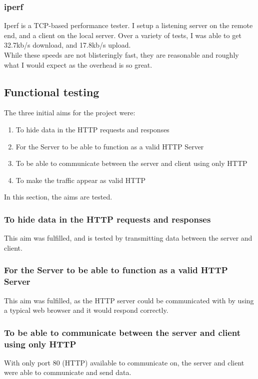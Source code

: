 \subsubsection{iperf}
Iperf is a TCP-based performance tester.
I setup a listening server on the remote end, and a client on the local server.
Over a variety of tests, I was able to get 32.7kb/s download, and 17.8kb/s upload.\\
While these speeds are not blisteringly fast, they are reasonable and roughly what I would expect as the overhead is so great.

\subsection{Functional testing}
The three initial aims for the project were:
\begin{enumerate}
    \item To hide data in the HTTP requests and responses
    \item For the Server to be able to function as a valid HTTP Server
    \item To be able to communicate between the server and client using only HTTP
    \item To make the traffic appear as valid HTTP
\end{enumerate}
In this section, the aims are tested.
\subsubsection{To hide data in the HTTP requests and responses}
This aim was fulfilled, and is tested by transmitting data between the server and client.

\subsubsection{For the Server to be able to function as a valid HTTP Server}
This aim was fulfilled, as the HTTP server could be communicated with by using a typical web browser and it would respond correctly.

\subsubsection{To be able to communicate between the server and client using only HTTP}
With only port 80 (HTTP) available to communicate on, the server and client were able to communicate and send data.

